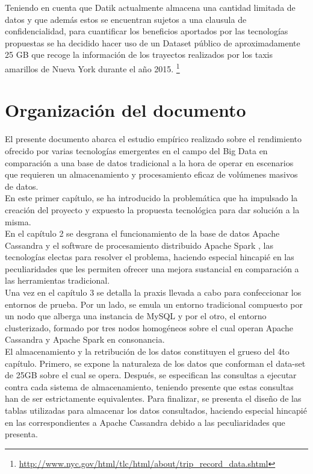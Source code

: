Teniendo en cuenta que Datik actualmente almacena una cantidad limitada de datos y que además estos se encuentran sujetos a una clausula de confidencialidad, para cuantificar los beneficios aportados por las tecnologías propuestas se ha decidido hacer uso de un Dataset público de aproximadamente 25 GB que recoge la información de los trayectos realizados por los taxis amarillos de Nueva York durante el año 2015. \footnote{\url{http://www.nyc.gov/html/tlc/html/about/trip_record_data.shtml}}

\section{Organización del documento}

El presente documento abarca el estudio empírico realizado sobre el rendimiento ofrecido por varias tecnologías emergentes en el campo del Big Data en comparación a una base de datos tradicional a la hora de operar en escenarios que requieren un almacenamiento y procesamiento eficaz de volúmenes masivos de datos.\\

En este primer capítulo, se ha introducido la problemática que ha impulsado la creación del proyecto y expuesto la propuesta tecnológica para dar solución a la misma.\\

En el capítulo 2 se desgrana el funcionamiento de la base de datos Apache Cassandra \cite{lakshman2010cassandra} y el software de procesamiento distribuido Apache Spark \cite{zaharia2010spark}, las tecnologías electas para resolver el problema, haciendo especial hincapié en las peculiaridades que les permiten ofrecer una mejora sustancial en comparación a las herramientas tradicional.\\

Una vez en el capítulo 3 se detalla la praxis llevada a cabo para confeccionar los entornos de prueba. Por un lado, se emula un entorno tradicional compuesto por un nodo que alberga una instancia de MySQL y por el otro, el entorno clusterizado, formado por tres nodos homogéneos sobre el cual operan Apache Cassandra y Apache Spark en consonancia.\\ 

El almacenamiento y la retribución de los datos constituyen el grueso del 4to capítulo. Primero, se expone la naturaleza de los datos que conforman el data-set de 25GB sobre el cual se opera. Después, se especifican las consultas a ejecutar contra cada sistema de almacenamiento, teniendo presente que estas consultas han de ser estrictamente equivalentes. Para finalizar, se presenta el diseño de las tablas utilizadas para almacenar los datos consultados, haciendo especial hincapié en las correspondientes a Apache Cassandra debido a las peculiaridades que presenta.\\ 

